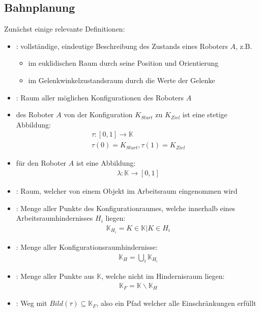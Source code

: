 \subsection{Bahnplanung}
Zunächst einige relevante Definitionen:
\begin{itemize}
\item {}: vollständige, eindeutige Beschreibung
des Zustands eines Roboters $A$, z.B.
\begin{itemize}
\item im euklidischen Raum durch seine Position und Orientierung
\item im Gelenkwinkelzustandsraum durch die Werte der Gelenke
\end{itemize}
\item {}: Raum aller
möglichen Konfigurationen des Roboters $A$
\item {} des Roboter $A$ von der Konfiguration $K_{Start}$ zu $K_{Ziel}$ ist eine stetige Abbildung:
\begin{align*}
\tau: [0, 1] \rightarrow \mathbb{K}\\
\tau(0) = K_{Start} ,\tau(1) = K_{Ziel}
\end{align*}
\item {} für den Roboter $A$ ist eine Abbildung:
\begin{align*}
\lambda : \mathbb{K} \rightarrow [0, 1]
\end{align*} 
\item {}: Raum, welcher von
einem Objekt im Arbeitsraum eingenommen wird
\item {}: Menge aller
Punkte des Konfigurationraumes, welche innerhalb eines
Arbeitsraumhindernisses $H_i$ liegen:
\begin{align*}
\mathbb{K}_{H_i} = {K \in \mathbb{K} | K \in H_i}
\end{align*}
\item {}: Menge aller
Konfigurationsraumhindernisse:
\begin{align*}
\mathbb{K}_H =\bigcup_i \mathbb{K}_{H_i}
\end{align*}
\item {}: Menge aller Punkte aus $\mathbb{K}$, welche nicht im
Hindernisraum liegen:
\begin{align*}
\mathbb{K}_F = \mathbb{K}\backslash \mathbb{K}_H
\end{align*}
\item {}: Weg mit $Bild(\tau) \subseteq \mathbb{K}_F$, also ein Pfad welcher alle Einschränkungen erfüllt
\end{itemize}
